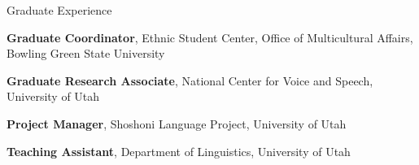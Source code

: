 \begin{rubric}{Graduate Experience}

    \entry*[2014 -- 2016][\faBookReader]%
        \textbf{Graduate Coordinator}, Ethnic Student Center, Office of Multicultural Affairs, Bowling Green State University
    
    \entry*[2013][\faBookReader]%
        \textbf{Graduate Research Associate}, National Center for Voice and Speech, University of Utah
            
    \entry*[2010 -- 2014][\faBookReader]%
        \textbf{Project Manager}, Shoshoni Language Project, University of Utah	
        
        \entry*[2010 -- 2013][\faBookReader]%
        \textbf{Teaching Assistant}, Department of Linguistics, University of Utah	
        
    \end{rubric}